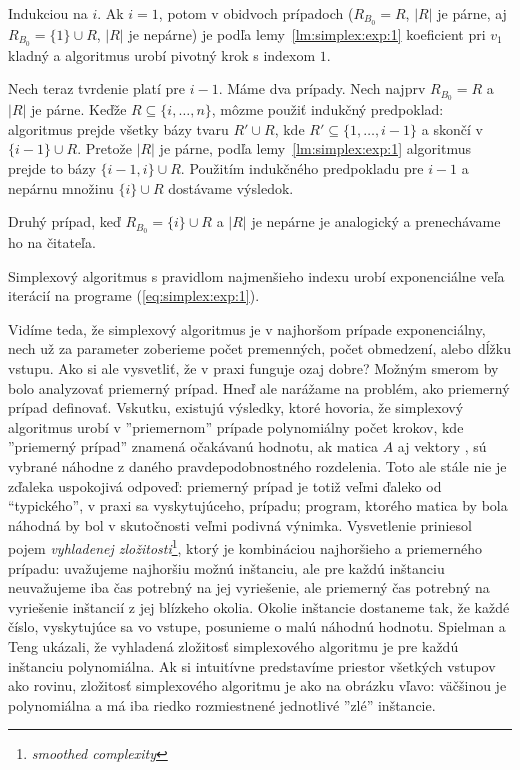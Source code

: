 \begin{dokaz}
  Indukciou na $i$. Ak $i=1$, potom v obidvoch prípadoch ($R_{B_0}=R$, $|R|$ je párne, aj 
  $R_{B_0}=\{1\}\cup R$, $|R|$ je nepárne) je podľa lemy~\ref{lm:simplex:exp:1} koeficient
  pri $v_1$ kladný a algoritmus urobí pivotný krok s indexom $1$. 

  \noindent
  Nech teraz tvrdenie platí pre $i-1$. Máme dva prípady. Nech najprv $R_{B_0}=R$ a $|R|$ je párne.
  Keďže $R\subseteq\{i,\ldots,n\}$, môzme použiť indukčný predpoklad: algoritmus prejde všetky
  bázy tvaru $R'\cup R$, kde $R'\subseteq\{1,\ldots,i-1\}$ a skončí v $\{i-1\}\cup R$.
  Pretože $|R|$ je párne, podľa lemy~\ref{lm:simplex:exp:1} algoritmus prejde to bázy
  $\{i-1,i\}\cup R$. Použitím indukčného predpokladu pre $i-1$ a nepárnu množinu $\{i\}\cup R$
  dostávame výsledok.

  \noindent
  Druhý prípad, keď $R_{B_0}=\{i\}\cup R$ a $|R|$ je nepárne je analogický a prenechávame ho na čitateľa.
\end{dokaz}

\begin{dosl}
  Simplexový algoritmus s pravidlom najmenšieho indexu urobí exponenciálne veľa iterácií na programe
  (\ref{eq:simplex:exp:1}).
\end{dosl}


\noindent
Vidíme teda, že simplexový algoritmus je v najhoršom prípade exponenciálny, nech už za parameter zoberieme počet
premenných, počet obmedzení, alebo dĺžku vstupu. Ako si ale vysvetliť, že v praxi funguje ozaj dobre? Možným
smerom by bolo analyzovať 
priemerný prípad. Hneď ale narážame na problém, ako priemerný prípad definovať. Vskutku, existujú výsledky,
ktoré hovoria, že simplexový algoritmus urobí v ''priemernom'' prípade polynomiálny počet krokov, kde 
''priemerný prípad'' znamená očakávanú hodnotu, ak  matica $A$ aj vektory ,  sú vybrané náhodne z
daného pravdepodobnostného rozdelenia. Toto ale stále nie je zďaleka uspokojivá odpoveď: priemerný prípad je
totiž veľmi ďaleko od ``typického'', v praxi sa vyskytujúceho, prípadu; program, ktorého matica by bola náhodná by 
bol v skutočnosti veľmi podivná výnimka. 
Vysvetlenie priniesol pojem {\em vyhladenej zložitosti}\footnote{{\em smoothed 
complexity}}, ktorý je kombináciou najhoršieho a priemerného prípadu:
uvažujeme najhoršiu možnú inštanciu, ale pre každú inštanciu neuvažujeme iba čas potrebný na jej
vyriešenie, ale priemerný čas potrebný na vyriešenie inštancií z jej blízkeho okolia.
Okolie inštancie dostaneme tak, že každé číslo, vyskytujúce sa vo vstupe, posunieme o malú náhodnú hodnotu.
Spielman a Teng \cite{ST04} ukázali, že vyhladená zložitosť simplexového algoritmu je pre každú inštanciu 
polynomiálna.
Ak si intuitívne predstavíme priestor všetkých vstupov ako rovinu, zložitosť simplexového algoritmu je
ako na obrázku vľavo: väčšinou je polynomiálna a má iba riedko rozmiestnené jednotlivé  ''zlé'' inštancie.

